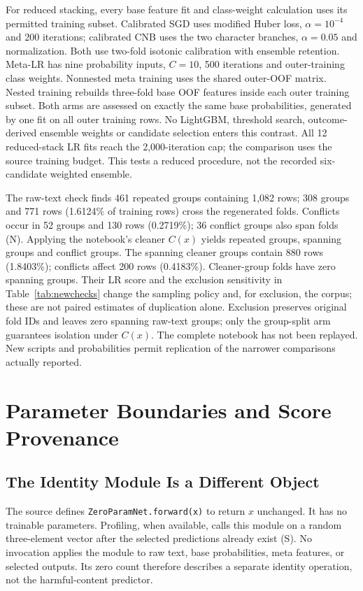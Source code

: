 \documentclass[doublecolumn]{ijcvsplatex}
\begin{document}
For reduced stacking, every base feature fit and class-weight calculation uses its permitted training subset. Calibrated SGD uses modified Huber loss, $\alpha=10^{-4}$ and 200 iterations; calibrated CNB uses the two character branches, $\alpha=0.05$ and normalization. Both use two-fold isotonic calibration with ensemble retention. Meta-LR has nine probability inputs, $C=10$, 500 iterations and outer-training class weights. Nonnested meta training uses the shared outer-OOF matrix. Nested training rebuilds three-fold base OOF features inside each outer training subset. Both arms are assessed on exactly the same base probabilities, generated by one fit on all outer training rows. No LightGBM, threshold search, outcome-derived ensemble weights or candidate selection enters this contrast. All 12 reduced-stack LR fits reach the 2,000-iteration cap; the comparison uses the source training budget. This tests a reduced procedure, not the recorded six-candidate weighted ensemble.

The raw-text check finds 461 repeated groups containing 1,082 rows; 308 groups and 771 rows (1.6124\% of training rows) cross the regenerated folds. Conflicts occur in 52 groups and 130 rows (0.2719\%); 36 conflict groups also span folds (N). Applying the notebook's cleaner $C(x)$ yields \CleanDuplicateGroups{} repeated groups, \CleanCrossGroups{} spanning groups and \CleanConflictGroups{} conflict groups. The spanning cleaner groups contain 880 rows (1.8403\%); conflicts affect 200 rows (0.4183\%). Cleaner-group folds have zero spanning groups. Their LR score and the exclusion sensitivity in Table~\ref{tab:newchecks} change the sampling policy and, for exclusion, the corpus; these are not paired estimates of duplication alone. Exclusion preserves original fold IDs and leaves zero spanning raw-text groups; only the group-split arm guarantees isolation under $C(x)$. The complete notebook has not been replayed. New scripts and probabilities permit replication of the narrower comparisons actually reported.

\section{Parameter Boundaries and Score Provenance}
\label{sec:accounting}

\subsection{The Identity Module Is a Different Object}
The source defines \texttt{ZeroParamNet.forward(x)} to return $x$ unchanged. It has no trainable parameters. Profiling, when available, calls this module on a random three-element vector after the selected predictions already exist (S). No invocation applies the module to raw text, base probabilities, meta features, or selected outputs. Its zero count therefore describes a separate identity operation, not the harmful-content predictor.
\end{document}
